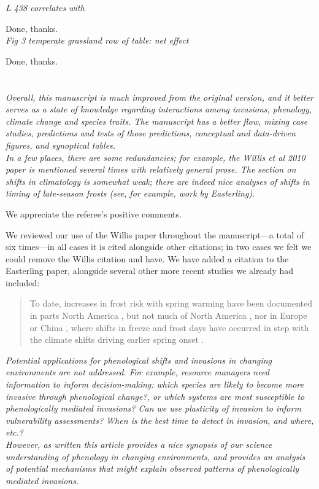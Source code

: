 \documentclass[11pt,a4paper]{letter}
\begin{document}
\begin{letter}{}
\emph{L 438 correlates with}

Done, thanks.\\

\emph{Fig 3 temperate grassland row of table: net effect } 

Done, thanks.\\

\\
\\
\emph{Overall, this manuscript is much improved from the original version, and it better serves as a state of knowledge regarding interactions among invasions, phenology, climate change and species traits. The manuscript has a better flow, mixing case studies, predictions and tests of those predictions, conceptual and data-driven figures, and synoptical tables.\\
In a few places, there are some redundancies; for example, the Willis et al 2010 paper is mentioned several times with relatively general prose. The section on shifts in climatology is somewhat weak; there are indeed nice analyses of shifts in timing of late-season frosts (see, for example, work by Easterling).}

We appreciate the referee's positive comments. 

We reviewed our use of the Willis paper throughout the manuscript---a total of six times---in all cases it is cited alongside other citations; in two cases we felt we could remove the Willis citation and have. We have added a citation to the Easterling paper, alongside several other more recent studies we already had included:

\begin{quote}
To date, increases in frost risk with spring warming have been documented in parts North America \citep{Inouye:2008gj,gu2008,Augspurger2013}, but not much of North America \citep{Easterling:2000sa}, nor in Europe \citep{Menzel2003a,Scheifinger2003} or China \citep{Dai2013}, where shifts in freeze and frost days have occurred in step with the climate shifts driving earlier spring onset \citep{Dai2013}. 
\end{quote}

\emph{Potential applications for phenological shifts and invasions in changing environments are not addressed. For example, resource managers need information to inform decision-making: which species are likely to become more invasive through phenological change?, or which systems are most susceptible to phenologically mediated invasions? Can we use plasticity of invasion to inform vulnerability assessments? When is the best time to detect in invasion, and where, etc.?\\
However, as written this article provides a nice synopsis of our science understanding of phenology in changing environments, and provides an analysis of potential mechanisms that might explain observed patterns of phenologically mediated invasions.}


\end{letter}
\end{document}
